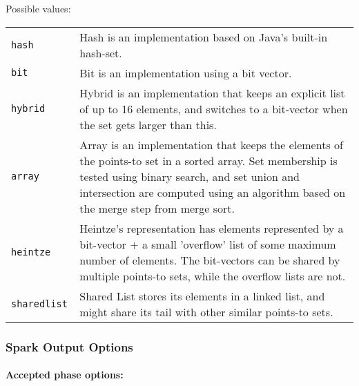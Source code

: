 \documentclass{article}
\begin{document}
\begin{description}
Possible values:\\
\begin{longtable}{p{1in}p{4in}}

{\tt hash }
&

Hash is an implementation based on Java's built-in hash-set.
\\

{\tt bit }
&

Bit is an implementation using a bit vector.
\\

{\tt hybrid }
&

Hybrid is an implementation that keeps an explicit list of up to
16 elements, and switches to a bit-vector when the set gets
larger than this.
\\

{\tt array }
&

Array is an implementation that keeps the elements of the
points-to set in a sorted array. Set membership is tested using
binary search, and set union and intersection are computed using
an algorithm based on the merge step from merge sort.
\\

{\tt heintze }
&
Heintze's representation has elements represented by a bit-vector + a small
									'overflow' list of some maximum number of elements.  The bit-vectors can be shared
									by multiple points-to sets, while the overflow lists are not.
								\\

{\tt sharedlist }
&
Shared List stores its elements in a linked list, and might share
									its tail with other similar points-to sets.
								\\

\end{longtable}


\end{description}

\subsubsection{Spark Output Options}


\paragraph{Accepted phase options:} 
\end{document}
